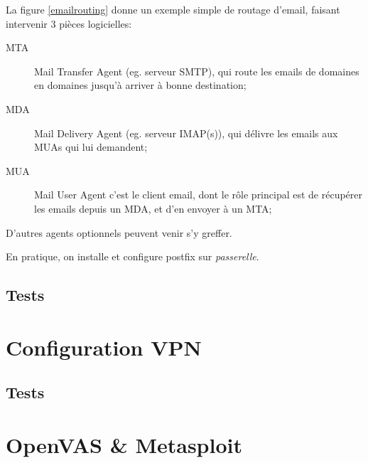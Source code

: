\documentclass[a4paper]{article}
\begin{document}
La figure \ref{emailrouting} donne un exemple simple de routage d'email,
faisant intervenir $3$ pièces logicielles:
\begin{description}
	\item[MTA] Mail Transfer Agent (eg. serveur SMTP), qui route les
		emails de domaines en domaines jusqu'à arriver à bonne destination;
	\item[MDA] Mail Delivery Agent (eg. serveur IMAP(s)), qui délivre
		les emails aux MUAs qui lui demandent;
	\item[MUA] Mail User Agent c'est le client email, dont le rôle principal
		est de récupérer les emails depuis un MDA, et d'en envoyer à un MTA;
\end{description}
D'autres agents optionnels peuvent venir s'y greffer.

En pratique, on installe et configure postfix sur \textit{passerelle}.

\subsection{Tests}

\section{Configuration VPN}
\subsection{Tests}

\section{OpenVAS \& Metasploit}
\end{document}
